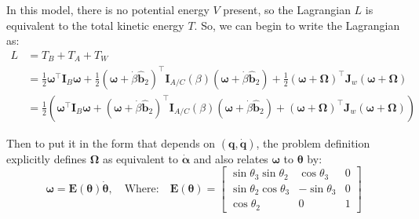 \documentclass[titlepage]{article}
\begin{document}
In this model, there is no potential energy $V$ present, so the Lagrangian $L$ is equivalent to the total kinetic energy $T$. So, we can begin to write the Lagrangian as:
\begin{equation}
	\begin{split}
		L&=T_B+T_A+T_W \\
		&=\frac{1}{2}\boldsymbol{\omega}^\top\boldsymbol{I}_B\boldsymbol{\omega}+\frac{1}{2}\left(\boldsymbol{\omega}+\dot{\beta}\hat{\boldsymbol{b}}_2\right)^\top\boldsymbol{I}_{A/C}(\beta)\left(\boldsymbol{\omega}+\dot{\beta}\hat{\boldsymbol{b}}_2\right)+\frac{1}{2}\left(\boldsymbol{\omega}+\boldsymbol{\Omega}\right)^\top\boldsymbol{J}_w\left(\boldsymbol{\omega}+\boldsymbol{\Omega}\right) \\
		&=\frac{1}{2}\left(\boldsymbol{\omega}^\top\boldsymbol{I}_B\boldsymbol{\omega}+\left(\boldsymbol{\omega}+\dot{\beta}\hat{\boldsymbol{b}}_2\right)^\top\boldsymbol{I}_{A/C}(\beta)\left(\boldsymbol{\omega}+\dot{\beta}\hat{\boldsymbol{b}}_2\right)+\left(\boldsymbol{\omega}+\boldsymbol{\Omega}\right)^\top\boldsymbol{J}_w\left(\boldsymbol{\omega}+\boldsymbol{\Omega}\right)\right)
	\end{split}
\end{equation}

Then to put it in the form that depends on $(\boldsymbol{q},\dot{\boldsymbol{q}})$, the problem definition explicitly defines $\boldsymbol{\Omega}$ as equivalent to $\dot{\boldsymbol{\alpha}}$ and also relates $\boldsymbol{\omega}$ to $\boldsymbol{\theta}$ by:
\begin{equation}
	\boldsymbol{\omega}=\boldsymbol{E}(\boldsymbol{\theta})\dot{\boldsymbol{\theta}},\quad\text{Where:}\quad\boldsymbol{E}(\boldsymbol{\theta})=
	\begin{bmatrix}
		\sin\theta_3\sin\theta_2 & \cos\theta_3 & 0 \\
		\sin\theta_2\cos\theta_3 & -\sin\theta_3 & 0 \\
		\cos\theta_2 & 0 & 1
	\end{bmatrix}
\end{equation}
\end{document}
